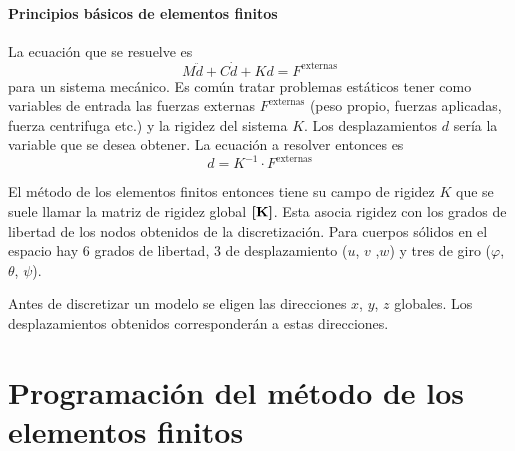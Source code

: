 \subsection*{Principios básicos de elementos finitos}

La ecuación que se resuelve es
\[
M\ddot{d} + C\dot{d} + Kd = F^{\mathrm{externas}}
\]
para un sistema mecánico. Es común tratar problemas estáticos tener como variables de entrada las fuerzas externas $F^{\mathrm{externas}}$ (peso propio, fuerzas aplicadas, fuerza centrifuga etc.) y la rigidez del sistema $K$. Los desplazamientos $d$ sería la variable que se desea obtener. La ecuación a resolver entonces es
\[
d =K^{-1} \cdot F^{\mathrm{externas}}
\]

El método de los elementos finitos entonces tiene su campo de rigidez $K$ que se suele llamar la matriz de rigidez global $\boldsymbol{[}\mathbf{K} \boldsymbol{]}$. Esta asocia rigidez con los grados de libertad de los nodos obtenidos de la discretización. Para cuerpos sólidos en el espacio hay 6 grados de libertad, 3 de desplazamiento ($u$, $v$ ,$w$) y tres de giro ($\varphi$, $\theta$, $\psi$). 

Antes de discretizar un modelo se eligen las direcciones $x$, $y$, $z$ globales. Los desplazamientos obtenidos corresponderán a estas direcciones.

\part{Programación del método de los elementos finitos}

\newcommand{\Numberof}{N}
\newcommand{\Numberlocal}{n}
\newcommand{\DOF}{\vartheta}
\newcommand{\Nnod}{\ensuremath{\Numberof_{\mathrm{nod.}}}}
\newcommand{\Ndims}{\ensuremath{\Numberof_{\mathrm{dim.}}}}
\newcommand{\Nelem}{\ensuremath{\Numberof_{\mathrm{elem.}}}}
\newcommand{\Ndofpornod}{\ensuremath{\DOF_{\mathrm{nod.}}}}
\newcommand{\Ndof}{\ensuremath{\Numberof_{\mathrm{dof}}}}

\newcommand{\Nnodporelem}{\ensuremath{\Numberlocal_{\mathrm{nod.}}}}
\newcommand{\Ndofporelem}{\ensuremath{\Numberlocal_{\mathrm{dof}}}}

